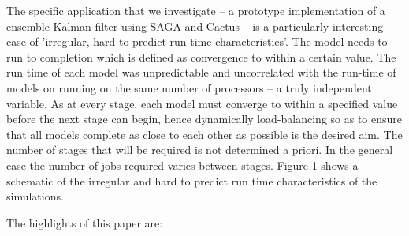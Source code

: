 \documentclass[conference,final]{IEEEtran}
\begin{document}






The specific application that we investigate -- a prototype
implementation of a ensemble Kalman filter using SAGA and Cactus -- is
a particularly interesting case of 'irregular, hard-to-predict run
time characteristics'.  The model needs to run to completion which is
defined as convergence to within a certain value.  The run time of
each model was unpredictable and uncorrelated with the run-time of
models on running on the same number of processors -- a truly
independent variable.  As at every stage, each model must converge to
within a specified value before the next stage can begin, hence
dynamically load-balancing so as to ensure that all models complete as
close to each other as possible is the desired aim.  The number of
stages that will be required is not determined a priori. In the
general case the number of jobs required varies between stages.
Figure 1 shows a schematic of the irregular and hard to predict run
time characteristics of the simulations.

\noindent The highlights of this paper are:
\end{document}
